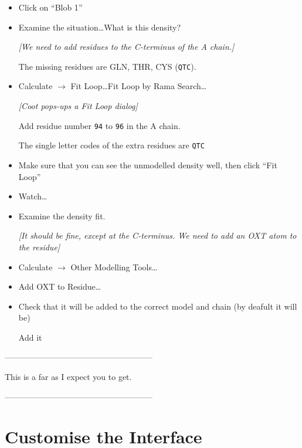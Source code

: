 \documentclass{article}
\begin{document}
\begin{itemize}
\item Click on ``\textsf{Blob 1}''

\item Examine the situation\ldots  What is this density?

  \emph{[We need to add residues to the C-terminus of the A chain.]}

The missing residues are GLN, THR, CYS (\texttt{QTC}).

\item \textsf{Calculate $\rightarrow$ Fit Loop\ldots Fit Loop by Rama Search\ldots}

\textsl{ [\emph{Coot} pops-ups a Fit Loop dialog]}

Add residue number \texttt{94} to \texttt{96} in the A chain.

The single letter codes of the extra residues are \texttt{QTC}

\item Make sure that you can see the unmodelled density well, then click \textsf{``Fit Loop''}

\item Watch\ldots

\item Examine the density fit.

  \textsl{ [It should be fine, except at the C-terminus.  We need to
    add an OXT atom to the residue]}

\item \textsf{Calculate $\rightarrow$ Other Modelling Tools\ldots}

\item \textsf{Add OXT to Residue\ldots}

\item Check that it will be added to the correct model and chain (by deafult it will be)

  \textsf{Add it}

\end{itemize}



\begin{center}
------------------------------------------------------

This is a far as I expect you to get.

------------------------------------------------------
\end{center}

\section{Customise the Interface}
\end{document}

